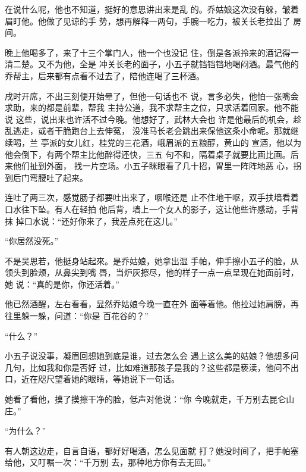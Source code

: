 在说什么呢，他也不知道，挺好的意思讲出来是乱
的。乔姑娘这次没有躲，皱着眉盯他。他做了见谅的手
势，想再解释一两句，手腕一吃力，被关长老拉出了
房间。

晚上他喝多了，来了十三个掌门人，他一个也没记
住，倒是各派拎来的酒记得一清二楚。又不为他，全是
冲关长老的面子，小五子就铛铛铛地喝闷酒。最气他的
乔帮主，后来都有点看不过去了，陪他连喝了三杯酒。

戌时开席，不出三刻便开始晕了，但他一句话也不
说，言多必失，他怕一张嘴会求助，来的都是前辈，帮我
主持公道，我不求帮主之位，只求活着回家。他不能说
这些，说出来也许活不过今晚。他想好了，武林大会也
许是他最后的机会，趁乱逃走，或者干脆跑台上去伸冤，
没准马长老会跳出来保他这条小命呢。那就继续喝，兰
亭派的女儿红，桂党的三花酒，峨眉派的五粮醇，黄山的
宣酒，他以为他会倒下，有两个帮主比他醉得还快，三五
句不和，隔着桌子就要比画比画。后来他们扯到外面，
找一片空场。小五子眯眼看了几十招，胃里一阵阵地恶
心，拐到后门弯腰吐了起来。

连吐了两三次，感觉肠子都要吐出来了，咽喉还是
止不住地干呕，双手扶墙看着口水往下坠。有人在轻拍
他后背，墙上一个女人的影子，这让他些许感动，手背抹
掉口水说：“还好你来了，我差点死在这儿。”

“你居然没死。”

不是吴思若，他挺身站起來。是乔姑娘，她拿出湿
手帕，伸手擦小五子的脸，从领头到脸颊，从鼻尖到嘴
唇，当炉灰擦尽，他的样子一点一点呈现在她面前时，她
说：“真的是你，你还活着。”

他已然酒醒，左右看看，显然乔姑娘今晚一直在外
面等着他。他拉过她肩膀，再往里躲一躲，问道：“你是
百花谷的？”

“什么？”

小五子说没事，凝眉回想她到底是谁，过去怎么会
遇上这么美的姑娘？他想多问几句，比如我和你是否好
过，比如难道那孩子是我的？这些都是亵渎，他问不出
口，近在咫尺望着她的眼睛，等她说下一句话。

她看了看他，摸了摸擦干净的脸，低声对他说：“你
今晚就走，千万别去昆仑山庄。”

“为什么？”

有人朝这边走，自言自语，都好好喝酒，怎么见面就
打？她没时间了，把手帕塞给他，又叮嘱一次：“千万别
去，那种地方你有去无回。”

\newpage